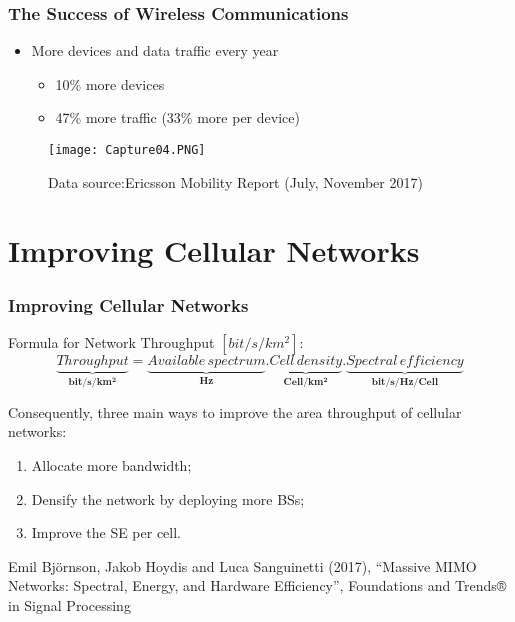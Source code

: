\documentclass{beamer}
\begin{document}
\begin{frame}[fragile=singleslide]\frametitle{The Success of Wireless Communications}

\begin{itemize}
\item More devices and data traffic every year
\begin{itemize}
\item 10\% more devices
\item 47\% more traffic (33\% more per device)
\end{itemize}
\end{itemize}
\begin{figure}
  \texttt{[image: Capture04.PNG]}
\caption{Data source:Ericsson Mobility Report (July, November 2017)} 
\end{figure}
\end{frame}



\section{Improving Cellular Networks}

\begin{frame}[fragile=singleslide]\frametitle{Improving Cellular Networks}

 Formula for Network Throughput $[bit/s/km^2]$:
\begin{equation}\label{throughput}  
\underbrace{Throughput}_{\mathbf{bit/s/km^2}}=\underbrace{Available\,spectrum}_{\mathbf{Hz}}.\underbrace{Cell\,density}_{\mathbf{Cell/km^2}}.\underbrace{Spectral\,efficiency}_{\mathbf{bit/s/Hz/Cell}}
\end{equation}


Consequently, three main ways to improve the area throughput of cellular networks:

\hspace{1cm}
\begin{enumerate}
\item Allocate more bandwidth;
\item Densify the network by deploying more BSs;
\item Improve the SE per cell.
\end{enumerate}

\vspace{1.2cm}

\tiny Emil Björnson, Jakob Hoydis and Luca Sanguinetti (2017), “Massive MIMO Networks: Spectral, Energy, and Hardware Efficiency”, Foundations and Trends® in Signal Processing

\end{frame}
\end{document}
